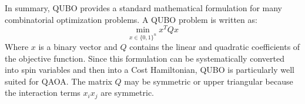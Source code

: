\highspace
In summary, QUBO provides a standard mathematical formulation for many combinatorial optimization problems. A QUBO problem is written as:
\begin{equation*}
    \min_{x \in \{0,1\}^n} x^T Q x
\end{equation*}
Where $x$ is a binary vector and $Q$ contains the linear and quadratic coefficients of the objective function. Since this formulation can be systematically converted into spin variables and then into a Cost Hamiltonian, QUBO is particularly well suited for QAOA. The matrix $Q$ may be symmetric or upper triangular because the interaction terms $x_i x_j$ are symmetric.